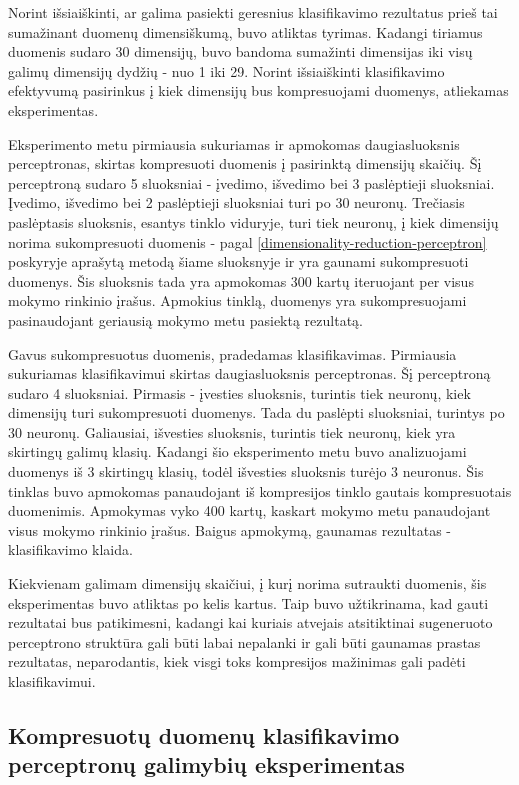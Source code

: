 \documentclass{VUMIFPSbakalaurinis}
\begin{document}
Norint išsiaiškinti, ar galima pasiekti geresnius klasifikavimo rezultatus prieš tai sumažinant duomenų dimensiškumą, buvo atliktas tyrimas.
Kadangi tiriamus duomenis sudaro 30 dimensijų, buvo bandoma sumažinti dimensijas iki visų galimų dimensijų dydžių - nuo 1 iki 29.
Norint išsiaiškinti klasifikavimo efektyvumą pasirinkus į kiek dimensijų bus kompresuojami duomenys, atliekamas eksperimentas.

Eksperimento metu pirmiausia sukuriamas ir apmokomas daugiasluoksnis perceptronas, skirtas kompresuoti duomenis į pasirinktą dimensijų skaičių.
Šį perceptroną sudaro 5 sluoksniai - įvedimo, išvedimo bei 3 paslėptieji sluoksniai.
Įvedimo, išvedimo bei 2 paslėptieji sluoksniai turi po 30 neuronų.
Trečiasis paslėptasis sluoksnis, esantys tinklo viduryje, turi tiek neuronų, į kiek dimensijų norima sukompresuoti duomenis - pagal \ref{dimensionality-reduction-perceptron} poskyryje aprašytą metodą šiame sluoksnyje ir yra gaunami sukompresuoti duomenys.
Šis sluoksnis tada yra apmokomas 300 kartų iteruojant per visus mokymo rinkinio įrašus.
Apmokius tinklą, duomenys yra sukompresuojami pasinaudojant geriausią mokymo metu pasiektą rezultatą.

Gavus sukompresuotus duomenis, pradedamas klasifikavimas.
Pirmiausia sukuriamas klasifikavimui skirtas daugiasluoksnis perceptronas.
Šį perceptroną sudaro 4 sluoksniai.
Pirmasis - įvesties sluoksnis, turintis tiek neuronų, kiek dimensijų turi sukompresuoti duomenys.
Tada du paslėpti sluoksniai, turintys po 30 neuronų.
Galiausiai, išvesties sluoksnis, turintis tiek neuronų, kiek yra skirtingų galimų klasių.
Kadangi šio eksperimento metu buvo analizuojami duomenys iš 3 skirtingų klasių, todėl išvesties sluoksnis turėjo 3 neuronus.
Šis tinklas buvo apmokomas panaudojant iš kompresijos tinklo gautais kompresuotais duomenimis.
Apmokymas vyko 400 kartų, kaskart mokymo metu panaudojant visus mokymo rinkinio įrašus.
Baigus apmokymą, gaunamas rezultatas - klasifikavimo klaida.

Kiekvienam galimam dimensijų skaičiui, į kurį norima sutraukti duomenis, šis eksperimentas buvo atliktas po kelis kartus.
Taip buvo užtikrinama, kad gauti rezultatai bus patikimesni, kadangi kai kuriais atvejais atsitiktinai sugeneruoto perceptrono struktūra gali būti labai nepalanki ir gali būti gaunamas prastas rezultatas, neparodantis, kiek visgi toks kompresijos mažinimas gali padėti klasifikavimui.


\subsection{Kompresuotų duomenų klasifikavimo perceptronų galimybių eksperimentas}
\end{document}

